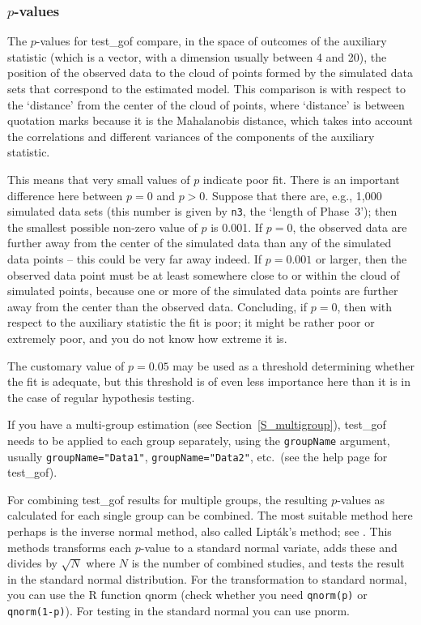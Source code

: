 \documentclass[a4paper,fleqn,11pt]{article}
\newcommand{\+}{\, + \,}
\newcommand{\sfn}[1]{\textsf{#1}}
\newcommand{\R}{{\sf R }}
\begin{document}
\subsubsection{$p$-values}
The $p$-values for \textsf{test\_gof} compare, in the space of outcomes
of the auxiliary statistic (which is a vector,
with a dimension usually between 4 and 20),
the position of the observed data to the cloud of
points formed by the simulated data sets that correspond
to the estimated model. This comparison is with respect to the
`distance' from the center of the cloud of points,
where `distance' is between quotation marks because it is the
Mahalanobis distance, which takes into account the correlations
and different variances of the components of the auxiliary statistic.

This means that very small values of $p$ indicate poor fit.
There is an important difference here between $p=0$ and $p>0$.
Suppose that there are, e.g., 1,000 simulated data sets
(this number is given by \texttt{n3}, the `length of Phase~3');
then the smallest possible non-zero value of $p$ is 0.001.
If $p=0$, the observed data are further away from the center of
the simulated data than any of the simulated data points -- this
could be very far away indeed. If $p=0.001$ or larger, then
the observed data point must be at least somewhere close to or within the
cloud of simulated points, because one or more of the simulated data
points are further away from the center than the observed data.
Concluding, if $p=0$, then with respect to the auxiliary statistic
the fit is poor; it might be rather poor or extremely poor,
and you do not know how extreme it is.

The customary value of $p=0.05$ may be used as a threshold determining
whether the fit is adequate, but this threshold is of even less
importance here than it is in the case of regular hypothesis testing.

If you have a multi-group estimation (see Section~\ref{S_multigroup}),
\textsf{test\_gof} needs to be applied to each group separately,
using the \texttt{groupName} argument, usually
\texttt{groupName="Data1"},  \texttt{groupName="Data2"}, etc.\
(see the help page for \textsf{test\_gof}).

For combining \textsf{test\_gof} results for multiple groups,
the resulting $p$-values
as calculated for each single group can be combined.
The most suitable method here perhaps is the inverse normal method,
also called Lipt\'{a}k's method; see \citet[][Section C.3]{HedgesOlkin85}.
This methods transforms each $p$-value to a standard normal variate, adds these
and divides by $\sqrt{N}$ where $N$ is the number of combined studies,
and tests the result in the standard normal distribution.
For the transformation to standard normal,
you can use the \R function \sfn{qnorm}
(check whether you need \texttt{qnorm(p)} or \texttt{qnorm(1-p)}).
For testing in the standard normal you can use \sfn{pnorm}.
\end{document}
